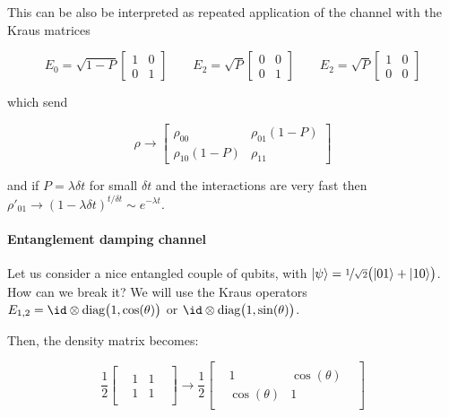 \documentclass[main.tex]{subfiles}
\begin{document}
\begin{bluebox}
  This can be also be interpreted as repeated application of the channel with the Kraus matrices

  \begin{equation}
      E_0 = \sqrt{1-P} \begin{bmatrix}
      1   & 0 \\
      0   & 1
  \end{bmatrix}
      \qquad
      E_2 = \sqrt{P} \begin{bmatrix}
      0   & 0  \\
      0   & 1
  \end{bmatrix}
      \qquad
      E_2 = \sqrt{P} \begin{bmatrix}
      1   & 0  \\
      0   & 0
  \end{bmatrix}
  \end{equation}

which send

\begin{equation}
    \rho \rightarrow \begin{bmatrix}
    \rho_{00}    & \rho_{01}(1-P) \\
     \rho_{10}(1-P)  & \rho_{11}
 \end{bmatrix}
\end{equation}

and if \(P = \lambda \delta t\) for small \(\delta t\) and the interactions are very fast then \(\rho'_{01} \rightarrow (1-\lambda \delta t)^{t/\delta t} \sim e^{-\lambda t}\).

\end{bluebox}

\paragraph{Entanglement damping channel}

Let us consider a nice entangled couple of qubits, with \(\ket{\psi} = \frac[i]{1}{\sqrt{2}} \qty(\ket{01} + \ket{10} )   \). How can we break it? We will use the Kraus operators \(E_{1,2} = \id \otimes \diag{1, \cos(\theta) }\) or \(\id \otimes \diag{1, \sin(\theta) }\).

Then, the density matrix becomes:

\begin{equation}
    \frac{1}{2}
    \begin{bmatrix}
       &   &   &  \\
       & 1  &  1 &  \\
       &  1 &  1 &  \\
       &   &   &
   \end{bmatrix}
    \rightarrow
    \frac{1}{2}
    \begin{bmatrix}
       &   &   &  \\
       & 1  & \cos(\theta)   &  \\
       &  \cos(\theta)  & 1  &  \\
       &   &   &
   \end{bmatrix}
\end{equation}
\end{document}
